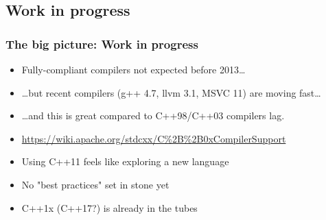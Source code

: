 \documentclass[xcolor=dvipsnames]{beamer}
\begin{document}
\subsection{Work in progress}
\begin{frame}[fragile]
\frametitle{The big picture: Work in progress}

\begin{itemize}
  \item Fully-compliant compilers not expected before 2013\ldots
  \pause
  \item \ldots but recent compilers (g++ 4.7, llvm 3.1, MSVC 11) are moving fast\ldots
  \pause
  \item \ldots and this is great compared to C++98/C++03 compilers lag.
  \pause
  \item {\footnotesize \url{https://wiki.apache.org/stdcxx/C%2B%2B0xCompilerSupport}}
\end{itemize}

\pause

\begin{itemize}
  \item Using C++11 feels like exploring a new language
  \pause
  \item No "best practices" set in stone yet
  \pause
  \item C++1x (C++17?) is already in the tubes
\end{itemize}
\end{frame}
\end{document}
